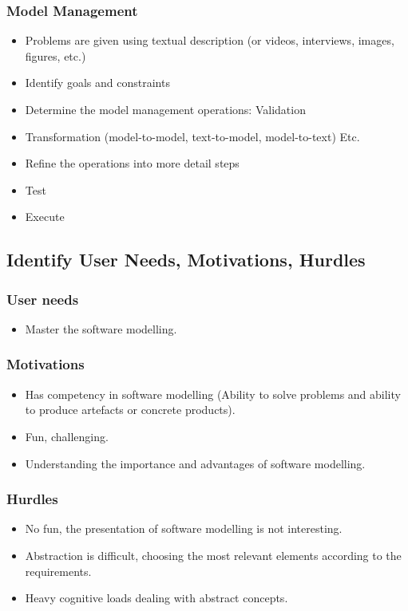\documentclass[12pt, a4paper]{report}
\begin{document}
\begin{appendices}
\subsubsection{Model Management}
\begin{itemize}
\item Problems are given using textual description (or videos, interviews, images, figures, etc.) 
\item Identify goals and constraints
\item Determine the model management operations:
Validation
\item Transformation (model-to-model, text-to-model, model-to-text)
Etc.
\item Refine the operations into more detail steps
\item Test
\item Execute
\end{itemize}

\subsection{Identify User Needs, Motivations, Hurdles}
\subsubsection{User needs}
\begin{itemize}
\item Master the software modelling.
\end{itemize}
\subsubsection{Motivations}
\begin{itemize}
\item Has competency in software modelling (Ability to solve problems and ability to produce artefacts or concrete products).
\item Fun, challenging.
\item Understanding the importance and advantages of software modelling.
\end{itemize}
\subsubsection{Hurdles}
\begin{itemize}
\item No fun, the presentation of software modelling is not interesting.
\item Abstraction is difficult, choosing the most relevant elements according to the requirements.
\item Heavy cognitive loads dealing with abstract concepts.
\end{itemize}


\end{appendices}
\end{document}
